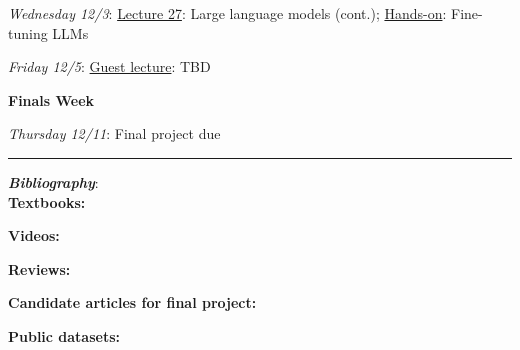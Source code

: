 \documentclass[12pt]{article}
\begin{document}
\emph{Wednesday 12/3}: \underline{Lecture 27}: Large language models (cont.); \underline{Hands-on}: Fine-tuning LLMs

\emph{Friday 12/5}: \underline{Guest lecture}: TBD

\noindent\textbf{Finals Week}

\emph{Thursday 12/11}: Final project due

\begin{center}
	\rule{\textwidth}{0.5pt}
\end{center}

\noindent\textbf{\emph{Bibliography}}:\\

\textbf{Textbooks:}

\newrefsection
\nocite{Mehta:2019,Abu-Mostafa:2012,Erdman:2021,Zeljko:2014,Calafiura:2022,Chollet:2021,Goodfellow-et-al-2016}
\printbibliography[heading=none]

\textbf{Videos:}

\newrefsection
\nocite{3blue1brown_neuralnetwork,3blue1brown_gradientdescent}
\printbibliography[heading=none]

\textbf{Reviews:}

\newrefsection
\nocite{Carleo:2019ptp,hepmllivingreview}
\printbibliography[heading=none]

\textbf{Candidate articles for final project:}

\newrefsection
\nocite{deOliveira:2015xxd,Aurisano:2016jvx,Komiske:2016rsd,Khan:2018opv,Zhou:2019,Moreno:2019neq,Ormiston:2020ele,Moreno:2021fvp,Erdmann:2019nie,Guest:2016iqz,Majorana:2023kmv}
\printbibliography[heading=none]

\textbf{Public datasets:}

\newrefsection
\nocite{kasieczka_gregor_2019_2603256,hbb_dataset,galaxy-zoo-the-galaxy-challenge,g2net-gravitational-wave-detection,trackml-particle-identification,majorana_collaboration_2023_8257027}
\printbibliography[heading=none]
\end{document}

